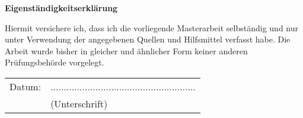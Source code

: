 \newpage
\thispagestyle{empty}
\begin{center}
    \vspace*{9em}
    \huge\textbf{Eigenständigkeitserklärung}\\
\end{center}
\vspace{6em}
Hiermit versichere ich, dass ich die vorliegende Masterarbeit selbständig und nur unter Verwendung der angegebenen Quellen und Hilfsmittel verfasst habe. Die Arbeit wurde bisher in gleicher und ähnlicher Form keiner anderen Prüfungsbehörde vorgelegt.

\vspace{6em}
\begin{minipage}{\linewidth}
    \begin{tabular}{p{21em}p{15em}}
        Datum: &  .......................................................\\
        & \centering (Unterschrift)\\
    \end{tabular}
\end{minipage}
